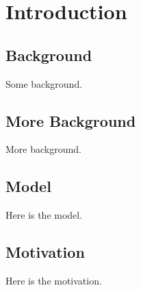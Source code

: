 %
%
\chapter{Introduction}
\setcounter{page}{1}
\hskip 0.5in
\noindent

\section{Background}

Some background. 

\section{More Background}

More background. 

\section{Model}

Here is the model.

\section{Motivation} 

Here is the motivation. 